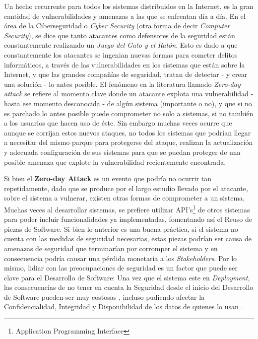 Un hecho recurrente para todos los sistemas distribuidos en la Internet, es la gran cantidad de vulnerabilidades y amenazas a las que se enfrentan día a día. En el área de la Ciberseguridad o \textit{Cyber Security} (otra forma de decir \textit{Computer Security}), se dice que tanto atacantes como defensores de la seguridad están constantemente realizando un \textit{Juego del Gato y el Ratón}. Esto es dado a que constantemente los atacantes se ingenian nuevas formas para cometer delitos informáticos, a través de las vulnerabilidades en los sistemas que están sobre la Internet, y que las grandes compañías de seguridad, tratan de detectar - y crear una solución - lo antes posible. El fenómeno en la literatura llamado \textit{Zero-day attack} se refiere al momento clave donde un atacante explota una vulnerabilidad - hasta ese momento desconocida - de algún sistema (importante o no), y que si no es parchado lo antes posible puede comprometer no solo a sistemas, si no también a los usuarios que hacen uso de éste. Sin embargo muchas veces ocurre que aunque se corrijan estos nuevos ataques, no todos los sistemas que podrían llegar a necesitar del mismo parque para protegerse del ataque, realizan la actualización y adecuada configuración de sus sistemas para que se puedan proteger de una posible amenaza que explote la vulnerabilidad recientemente encontrada.

Si bien el \textbf{Zero-day Attack} es un evento que podría no ocurrir tan repetidamente, dado que se produce por el largo estudio llevado por el atacante, sobre el sistema a vulnerar, existen otras formas de comprometer a un sistema. Muchas veces al desarrollar sistemas, se prefiere utilizar API's\footnote{Application Programming Interface} de otros sistemas para poder incluir funcionalidades ya implementadas, fomentando así el Reuso de piezas de Software. Si bien lo anterior es una buena práctica, si el sistema no cuenta con las medidas de seguridad necesarias, estas piezas podrían ser causa de amenazas de seguridad que terminarían por corromper el sistema y en consecuencia podría causar una pérdida monetaria a los \textit{Stakeholders}. Por lo mismo, lidiar con las preocupaciones de seguridad es un factor que puede ser clave para el Desarrollo de Software: Una vez que el sistema este en \textit{Deployment}, las consecuencias de no tener en cuenta la Seguridad desde el inicio del Desarrollo de Software pueden ser muy costosas \cite{cert}, incluso pudiendo afectar la Confidencialidad, Integridad y Disponibilidad de los datos de quienes lo usan \cite{interCoursera}. %

